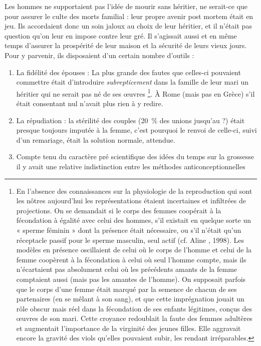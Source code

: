 Les hommes ne supportaient pas l'idée de mourir sans héritier, ne
serait-ce que pour assurer le culte des morts familial : leur propre avenir
post mortem était en jeu. Ils accordaient donc un soin jaloux au choix de
leur héritier, et il n'était pas question qu'on leur en impose contre leur
gré. Il s'agissait aussi et en même temps d'assurer la prospérité de leur
maison et la sécurité de leurs vieux jours. Pour y parvenir, ils disposaient
d'un certain nombre d'outils :

\begin{enumerate}
\item La fidélité des épouses : La plus grande des fautes que celles-ci
pouvaient commettre était d'introduire \emph{subrepticement} dans la famille de
leur mari un héritier qui ne serait pas né de ses œuvres%
\footnote{En l'absence des connaissances sur la physiologie de la reproduction qui sont les nôtres aujourd'hui les représentations étaient incertaines et infiltrées de projections. On se demandait si le corps des femmes coopérait à la 
fécondation à égalité avec celui des hommes, s'il existait en quelque sorte un « sperme féminin » dont la présence 
était nécessaire, ou s'il n'était qu'un réceptacle passif pour le sperme masculin, seul actif (cf. Aline , 
1998). Les modèles en présence oscillaient de celui où le corps de l'homme et celui de la femme coopèrent à la fécondation à celui où seul l'homme compte, mais ils n'écartaient pas absolument celui où les précédents amants de 
la femme comptaient aussi (mais pas les amantes de l'homme). On supposait parfois que le corps d'une femme 
était marqué par la semence de chacun de ses partenaires (en se mêlant à son sang), et que cette imprégnation jouait
un rôle obscur mais réel
dans la fécondation de ses
enfants légitimes,
conçus des œuvres
de son mari. Cette 
croyance redoublait la faute des femmes adultères et augmentait l'importance de la virginité des jeunes filles. Elle 
aggravait encore la gravité des viols qu'elles pouvaient subir, les rendant irréparables.}.
À Rome (mais pas en Grèce) s'il était consentant nul n'avait plus rien à y redire.
\item La répudiation : la stérilité des couples (20~\% des unions jusqu'au
 ?) était presque toujours imputée à la femme, c'est
pourquoi le renvoi de celle-ci, suivi d'un remariage, était la solution normale,
attendue.
\item Compte tenu du caractère pré scientifique des idées du temps
sur la grossesse il y avait une relative indistinction entre les méthodes anticonceptionnelles

\end{enumerate}
